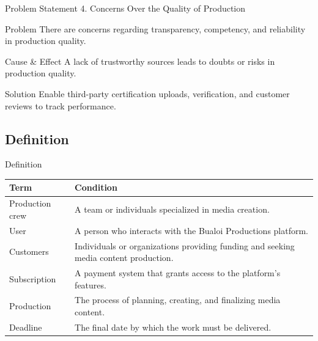 \documentclass[aspectratio=169]{beamer}
\begin{document}
\begin{frame}{Problem Statement}
    4. Concerns Over the Quality of Production
    \begin{alertblock}{Problem}
        There are concerns regarding transparency, competency, and reliability in production quality.
    \end{alertblock}

    \begin{block}{Cause \& Effect}
        A lack of trustworthy sources leads to doubts or risks in production quality.
    \end{block}

    \begin{exampleblock}{Solution}
        Enable third-party certification uploads, verification, and customer reviews to track performance.
    \end{exampleblock}

\end{frame}

\subsection{Definition}
\begin{frame}{Definition}

    \begin{table}[ht]
        \centering
        \begin{tabular}{|l|p{9cm}|}
            \hline
            \textbf{Term}   & \textbf{Condition}                                                                   \\ \hline
            Production crew & A team or individuals specialized in media creation.                                 \\ \hline
            User            & A person who interacts with the Bualoi Productions platform.                         \\ \hline
            Customers       & Individuals or organizations providing funding and seeking media content production. \\ \hline
            Subscription    & A payment system that grants access to the platform's features.                      \\ \hline
            Production      & The process of planning, creating, and finalizing media content.                     \\ \hline
            Deadline        & The final date by which the work must be delivered.                                  \\ \hline
        \end{tabular}
    \end{table}
\end{frame}
\end{document}
